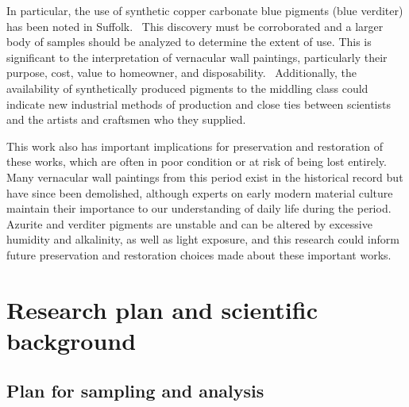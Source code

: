 In particular, the use of synthetic copper carbonate blue pigments (blue verditer) has been noted in Suffolk.~\autocite{Baird_thesis, Kirkham_thesis} This discovery must be corroborated and a larger body of samples should be analyzed to determine the extent of use. This is significant to the interpretation of vernacular wall paintings, particularly their purpose, cost, value to homeowner, and disposability.~\autocite{Baird_thesis,Davies_book} Additionally, the availability of synthetically produced pigments to the middling class could indicate new industrial methods of production and close ties between scientists and the artists and craftsmen who they supplied. 

This work also has important implications for preservation and restoration of these works, which are often in poor condition or at risk of being lost entirely. Many vernacular wall paintings from this period exist in the historical record but have since been demolished, although experts on early modern material culture maintain their importance to our understanding of daily life during the period.~\autocite{Davies_book,Hamling_book,Benton1,Benton2} Azurite and verditer pigments are unstable and can be altered by excessive humidity and alkalinity, as well as light exposure, and this research could inform future preservation and restoration choices made about these important works.~\autocite{Saunders,Cardell,Lluveras,Mattei,Dei}

\section[Research plan and scientific background]{Research plan and scientific background}
\label{section1.2}

\subsection[Plan for sampling and analysis]{Plan for sampling and analysis}
\label{subsection1.2.1}


